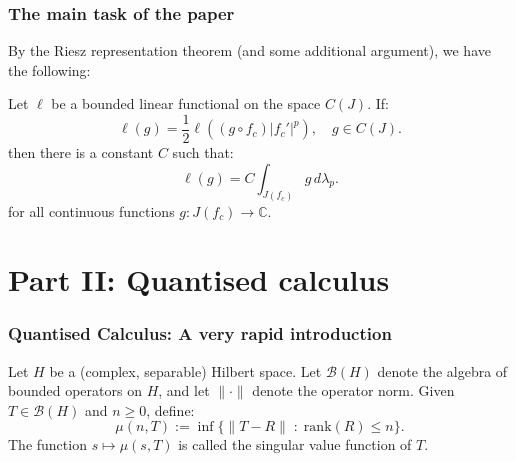 \documentclass{beamer} %
\theoremstyle{definition} %
\newcommand{\Cplx}{\mathbb{C}}
\begin{document}
% 
%     

\begin{frame}\frametitle{The main task of the paper}
    By the Riesz representation theorem (and some additional argument), we have the following:
    \begin{theorem}
        Let $\ell$ be a bounded linear functional on the space $C(J)$. If:
        \begin{equation*}
            \ell(g) = \frac{1}{2}\ell((g\circ f_c)|f_c'|^p),\quad g \in C(J).
        \end{equation*}
        then there is a constant $C$ such that:
        \begin{equation*}
            \ell(g) = C\int_{J(f_c)} g\,d\lambda_p.
        \end{equation*}
        for all continuous functions $g:J(f_c)\to \Cplx$.
    \end{theorem}
\end{frame}


\section{Part II: Quantised calculus}

\begin{frame}\frametitle{Quantised Calculus: A very rapid introduction}
    Let $H$ be a (complex, separable) Hilbert space. Let $\mathcal{B}(H)$ denote the algebra
    of bounded operators on $H$, and let $\|\cdot\|$ denote the operator norm. Given $T \in \mathcal{B}(H)$ and $n \geq 0$, define:
    \begin{equation*}
        \mu(n,T) := \inf\{\|T-R\|\;:\;\mathrm{rank}(R) \leq n\}.
    \end{equation*}
    The function $s\mapsto \mu(s,T)$ is called the singular value function of $T$.
\end{frame}
\end{document}
